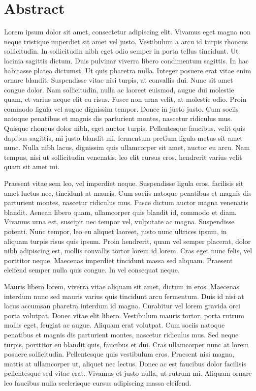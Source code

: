 \cleardoublepage\pagestyle{fancy}

\chapter*{Abstract}

Lorem ipsum dolor sit amet, consectetur adipiscing elit. Vivamus eget magna non neque tristique imperdiet sit amet vel justo. Vestibulum a arcu id turpis rhoncus sollicitudin. In sollicitudin nibh eget odio semper in porta tellus tincidunt. Ut lacinia sagittis dictum. Duis pulvinar viverra libero condimentum sagittis. In hac habitasse platea dictumst. Ut quis pharetra nulla. Integer posuere erat vitae enim ornare blandit. Suspendisse vitae nisi turpis, at convallis dui. Nunc sit amet congue dolor. Nam sollicitudin, nulla ac laoreet euismod, augue dui molestie quam, et varius neque elit eu risus. Fusce non urna velit, at molestie odio. Proin commodo ligula vel augue dignissim tempor. Donec in justo justo. Cum sociis natoque penatibus et magnis dis parturient montes, nascetur ridiculus mus. Quisque rhoncus dolor nibh, eget auctor turpis. Pellentesque faucibus, velit quis dapibus sagittis, mi justo blandit mi, fermentum pretium ligula metus sit amet nunc. Nulla nibh lacus, dignissim quis ullamcorper sit amet, auctor eu arcu. Nam tempus, nisi ut sollicitudin venenatis, leo elit cursus eros, hendrerit varius velit quam sit amet mi.

Praesent vitae sem leo, vel imperdiet neque. Suspendisse ligula eros, facilisis sit amet luctus nec, tincidunt at mauris. Cum sociis natoque penatibus et magnis dis parturient montes, nascetur ridiculus mus. Fusce dictum auctor magna venenatis blandit. Aenean libero quam, ullamcorper quis blandit id, commodo et diam. Vivamus urna est, suscipit nec tempor vel, vulputate ac magna. Suspendisse potenti. Nunc tempor, leo eu aliquet laoreet, justo nunc ultrices ipsum, in aliquam turpis risus quis ipsum. Proin hendrerit, quam vel semper placerat, dolor nibh adipiscing est, mollis convallis tortor lorem id lorem. Cras eget nunc felis, vel porttitor neque. Maecenas imperdiet tincidunt massa sed aliquam. Praesent eleifend semper nulla quis congue. In vel consequat neque.

Mauris libero lorem, viverra vitae aliquam sit amet, dictum in eros. Maecenas interdum nunc sed mauris varius quis tincidunt arcu fermentum. Duis id nisi at lacus accumsan pharetra interdum id magna. Curabitur vel lorem gravida orci porta volutpat. Donec vitae elit libero. Vestibulum mauris tortor, porta rutrum mollis eget, feugiat ac augue. Aliquam erat volutpat. Cum sociis natoque penatibus et magnis dis parturient montes, nascetur ridiculus mus. Sed neque turpis, porttitor eu blandit quis, faucibus et dui. Cras ullamcorper nunc at lorem posuere sollicitudin. Pellentesque quis vestibulum eros. Praesent nisi magna, mattis at ullamcorper ut, aliquet nec lectus. Donec ac est faucibus dolor facilisis pellentesque sed vitae erat. Vivamus et justo nulla, ut rutrum mi. Aliquam ornare leo faucibus nulla scelerisque cursus adipiscing massa eleifend.

